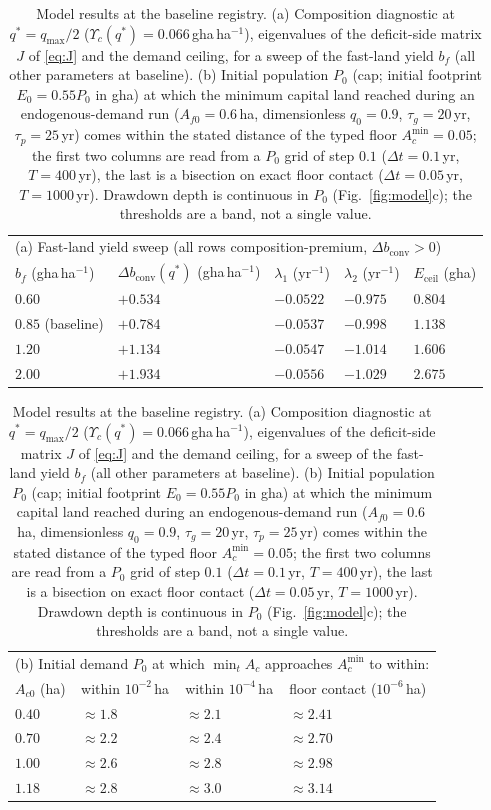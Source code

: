 \documentclass[preprint,12pt,authoryear]{elsarticle}
\newcommand{\dconv}{\Delta b_{\mathrm{conv}}}
\newcommand{\Ups}{\Upsilon_c}
\newcommand{\Eceil}{E_{\mathrm{ceil}}}
\newcommand{\Acmin}{A_c^{\min}}
\begin{document}
\begin{table}[!htbp]
\centering\small
\caption{Model results at the baseline registry. (a) Composition diagnostic at $q^*=q_{\max}/2$ ($\Ups(q^*)=0.066$\,gha\,ha$^{-1}$), eigenvalues of the deficit-side matrix $J$ of \eqref{eq:J} and the demand ceiling, for a sweep of the fast-land yield $b_f$ (all other parameters at baseline). (b) Initial population $P_0$ (cap; initial footprint $E_0=0.55P_0$ in gha) at which the minimum capital land reached during an endogenous-demand run ($A_{f0}=0.6$\,ha, dimensionless $q_0=0.9$, $\tau_g=20$\,yr, $\tau_p=25$\,yr) comes within the stated distance of the typed floor $\Acmin=0.05$; the first two columns are read from a $P_0$ grid of step $0.1$ ($\Delta t=0.1$\,yr, $T=400$\,yr), the last is a bisection on exact floor contact ($\Delta t=0.05$\,yr, $T=1000$\,yr). Drawdown depth is continuous in $P_0$ (Fig.~\ref{fig:model}c); the thresholds are a band, not a single value.}
\label{tab:model}
\begin{tabular}{l l l l l}
\toprule
\multicolumn{5}{l}{(a) Fast-land yield sweep (all rows composition-premium, $\dconv>0$)}\\
$b_f$ (gha\,ha$^{-1}$) & $\dconv(q^*)$ (gha\,ha$^{-1}$) & $\lambda_1$ (yr$^{-1}$) & $\lambda_2$ (yr$^{-1}$) & $\Eceil$ (gha) \\
\midrule
$0.60$ & $+0.534$ & $-0.0522$ & $-0.975$ & $0.804$ \\
$0.85$ (baseline) & $+0.784$ & $-0.0537$ & $-0.998$ & $1.138$ \\
$1.20$ & $+1.134$ & $-0.0547$ & $-1.014$ & $1.606$ \\
$2.00$ & $+1.934$ & $-0.0556$ & $-1.029$ & $2.675$ \\
\bottomrule
\end{tabular}

\medskip
\begin{tabular}{l l l l}
\toprule
\multicolumn{4}{l}{(b) Initial demand $P_0$ at which $\min_tA_c$ approaches $\Acmin$ to within:}\\
$A_{c0}$ (ha) & within $10^{-2}$\,ha & within $10^{-4}$\,ha & floor contact ($10^{-6}$\,ha) \\
\midrule
$0.40$ & $\approx1.8$ & $\approx2.1$ & $\approx2.41$ \\
$0.70$ & $\approx2.2$ & $\approx2.4$ & $\approx2.70$ \\
$1.00$ & $\approx2.6$ & $\approx2.8$ & $\approx2.98$ \\
$1.18$ & $\approx2.8$ & $\approx3.0$ & $\approx3.14$ \\
\bottomrule
\end{tabular}
\end{table}
\end{document}
